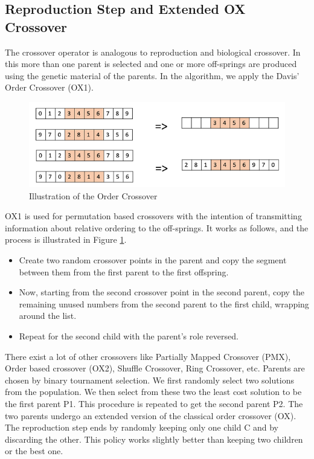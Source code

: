 \documentclass[journal,twoside,web]{ieeecolor}
\begin{document}
\subsection{Reproduction Step and Extended OX Crossover}
The crossover operator is analogous to reproduction and biological crossover. In this more than one parent is selected and one or more off-springs are produced using the genetic material of the parents. In the algorithm, we apply the Davis’ Order Crossover (OX1). \par
\begin{figure}[!t]
\centerline{\includegraphics[width=\columnwidth]{ox.png}}
\caption{Illustration of the Order Crossover}
\label{ox}
\end{figure}
OX1 is used for permutation based crossovers with the intention of transmitting information about relative ordering to the off-springs. It works as follows, and the process is illustrated in Figure \ref{ox}.
\begin{itemize}
  \item Create two random crossover points in the parent and copy the segment between them from the first parent to the first offspring.
  \item Now, starting from the second crossover point in the second parent, copy the remaining unused numbers from the second parent to the first child, wrapping around the list.
  \item Repeat for the second child with the parent’s role reversed.
\end{itemize}
\par There exist a lot of other crossovers like Partially Mapped Crossover (PMX), Order based crossover (OX2), Shuffle Crossover, Ring Crossover, etc.
Parents are chosen by binary tournament selection. We first randomly select two solutions from the population. We then select from these two the least cost solution to be the first parent P1. This procedure is repeated to get the second parent P2. The two parents undergo an extended version of the classical order crossover (OX). The reproduction step ends by randomly keeping only one child C and by discarding the other. This policy works slightly better than keeping two children or the best one. \par
\end{document}
